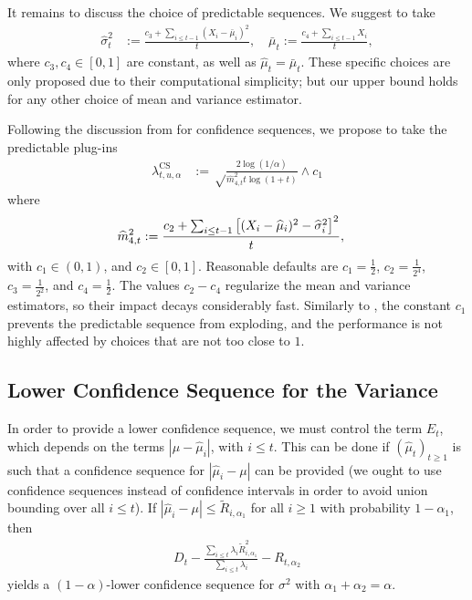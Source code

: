 It remains to discuss the choice of predictable sequences. We suggest to take
\begin{align*}
    \widehat\sigma_{t}^2 &:= \frac{c_3 + \sum_{i \leq t-1} (X_i - \bar\mu_i)^2}{t}, \quad \bar\mu_t := \frac{c_4 + \sum_{i\leq t-1}X_i}{t},
\end{align*}
where $c_3, c_4 \in [0,1]$ are constant, as well as $\widehat\mu_t = \bar\mu_t$. These specific choices are only proposed due to their computational simplicity; but our upper bound holds for any other choice of mean and variance estimator.


Following the discussion from \citet[Section 3.3]{waudby2024estimating} for confidence sequences, we propose to take the predictable plug-ins
\begin{align*}
    \lambda_{t, u, \alpha}^{\text{CS}} &:= \sqrt\frac{2\log(1/\alpha)}{\widehat m_{4, t}^2 t \log (1+t)} \wedge c_1
\end{align*}
where  
\begin{align*}
    \widehat m_{4, t}^2 &:= \frac{c_2 + \sum_{i \leq t-1} \left[ (X_i - \widehat\mu_i)^2 - \widehat\sigma_i^2 \right]^2 }{t}, 
\end{align*}
with $c_1 \in (0,1)$, and $c_2 \in [0,1]$. Reasonable defaults are $c_1 = \frac{1}{2}$, $c_2 = \frac{1}{2^4}$, $c_3 = \frac{1}{2^2}$, and $c_4 = \frac{1}{2}$. The values  $c_2-c_4$  regularize the mean and variance estimators, so their impact decays considerably fast. Similarly to \citet{waudby2024estimating}, the constant $c_1$ prevents the predictable sequence from exploding, and the performance is not highly affected by choices that are not too close to $1$.




\subsection{Lower Confidence Sequence for the Variance} \label{section:lower_bound}
In order to provide a lower confidence sequence, we must control the term $E_t$, which depends on the terms $|\mu-\widehat\mu_i|$, with $i \leq t$. This can be done if $(\widehat\mu_t)_{t \geq 1}$ is such that a confidence sequence for $|\widehat\mu_i - \mu|$ can be provided (we ought to use confidence sequences instead of confidence intervals in order to avoid union bounding over all $i \leq t$). If $|\widehat\mu_i - \mu| \leq \tilde R_{i, \alpha_1}$ for all $i \geq 1$ with probability $1-\alpha_1$, then
\begin{align} \label{eq:lower_bound_with_lambdas}
    D_t - \frac{\sum_{i \leq t}\lambda_i \tilde R_{i, \alpha_1}^2}{\sum_{i \leq t} \lambda_i} -  R_{t, \alpha_2}
\end{align}
yields a $(1-\alpha)$-lower confidence sequence for $\sigma^2$ with $\alpha_1 + \alpha_2 = \alpha$. 




